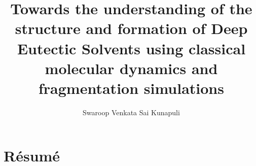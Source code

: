 \documentclass{customformat}
\begin{document}
\author{Swaroop Venkata Sai Kunapuli}

\title{Towards the understanding of the structure and formation of Deep Eutectic Solvents using classical molecular dynamics and fragmentation simulations}
\maketitle
\section*{Résumé}



\end{document}
